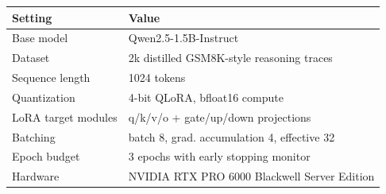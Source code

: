 \begin{tabular}{ll}
\toprule
Setting & Value \\ 
\midrule
Base model & Qwen2.5-1.5B-Instruct \\ 
Dataset & 2k distilled GSM8K-style reasoning traces \\ 
Sequence length & 1024 tokens \\ 
Quantization & 4-bit QLoRA, bfloat16 compute \\ 
LoRA target modules & q/k/v/o + gate/up/down projections \\ 
Batching & batch 8, grad. accumulation 4, effective 32 \\ 
Epoch budget & 3 epochs with early stopping monitor \\ 
Hardware & NVIDIA RTX PRO 6000 Blackwell Server Edition \\ 
\bottomrule
\end{tabular}
